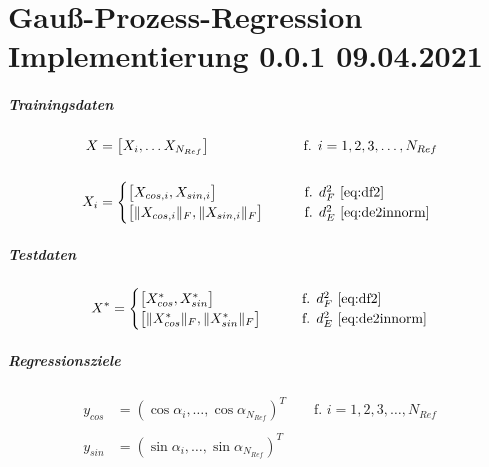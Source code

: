 %

\chapter{Gauß-Prozess-Regression Implementierung 0.0.1 09.04.2021}\label{ch:gpr-imp}


\paragraph*{Trainingsdaten}


\begin{align}\label{eq:trainds}
	X   &= \big[ X_i, \ldots X_{N_{Ref}} \big] \qquad\qquad\qquad\quad\!  \text{f. } i = 1,2,3,\ldots,N_{Ref} \nonumber \\
	\\
	X_i &= 
		\begin{cases}
			\big[ X_{cos,i}, X_{sin,i} \big]             &\qquad \text{f. } d_F^2 \text{ \autoref{eq:df2}} \\
			\big[ \|X_{cos,i}\|_F, \|X_{sin,i}\|_F \big] &\qquad \text{f. } d_E^2 \text{ \autoref{eq:de2innorm}}
		\end{cases} \nonumber
\end{align}


\paragraph*{Testdaten}


\begin{equation}\label{eq:testds}
	X^* = 
	\begin{cases}
		\big[ X_{cos}^*, X_{sin}^* \big]             &\qquad \text{f. } d_F^2 \text{ \autoref{eq:df2}} \\
		\big[ \|X_{cos}^*\|_F, \|X_{sin}^*\|_F \big] &\qquad \text{f. } d_E^2 \text{ \autoref{eq:de2innorm}}
	\end{cases}
\end{equation}



\paragraph*{Regressionsziele}


\begin{align}\label{eq:gprtarget}
y_{cos} &= (\cos \alpha_i, \ldots, \cos \alpha_{N_{Ref}})^T \qquad \text{f. } i = 1,2,3,\ldots,N_{Ref} \nonumber \\
\\
y_{sin} &= (\sin \alpha_i, \ldots, \sin \alpha_{N_{Ref}})^T \nonumber
\end{align}


